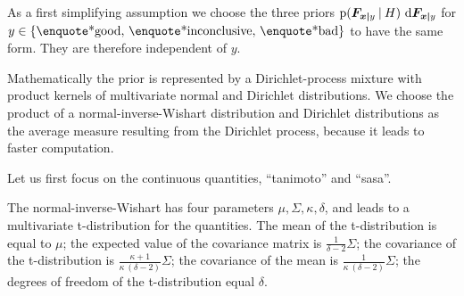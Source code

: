 \documentclass[\ifafour a4paper,12pt,\else a5paper,10pt,\fi%
onecolumn,oneside,article,%
british%
]{memoir}
\theoremstyle{remark}
\theoremstyle{innote}
\newcommand*{\di}{\mathrm{d}}%
\DeclarePairedDelimiter\set{\{}{\}}
\newcommand*{\p}{\mathrm{p}}%
\renewcommand*{\|}[1][]{\nonscript\:#1\vert\nonscript\:\mathopen{}}
\renewcommand*{\=}{\TextOrMath\texteq\eq}
\newcommand*{\yF}{\bm{F}}
\begin{document}
As a first simplifying assumption we choose the three priors
$\p(\yF_{\bm{x\mid}y} \| H)\ \di\yF_{\bm{x\mid}y}$ for
$y \in \set{\text{\enquote*{good}},\, \text{\enquote*{inconclusive}},\,
  \text{\enquote*{bad}}}$ to have the same form. They are therefore
independent of $y$.

Mathematically the prior is represented by a Dirichlet-process mixture with
product kernels of multivariate normal and Dirichlet distributions. We
choose the product of a normal-inverse-Wishart distribution and Dirichlet
distributions as the average measure resulting from the Dirichlet process,
because it leads to faster computation.

Let us first focus on the continuous quantities, \enquote{tanimoto} and
\enquote{sasa}.

The normal-inverse-Wishart has four parameters
$\mu, \varSigma, \kappa, \delta$, and leads to a multivariate
t-distribution for the quantities. The mean of the t-distribution is equal
to $\mu$; the expected value of the covariance matrix is
$\frac{1}{\delta-2}\varSigma$; the covariance of the t-distribution is
$\frac{\kappa+1}{\kappa\ (\delta-2)}\varSigma$; the covariance of the mean
is $\frac{1}{\kappa\ (\delta-2)}\varSigma$; the degrees of freedom of the
t-distribution equal $\delta$.
\end{document}
